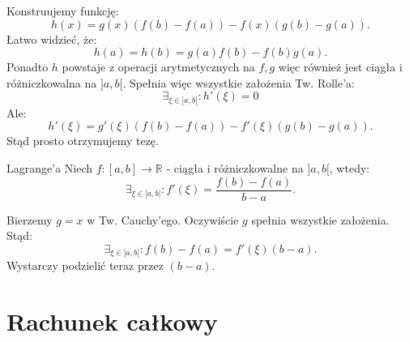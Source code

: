 \documentclass{article}
\numberwithin{defi}{section}
\numberwithin{defi}{section}
\newcommand{\R}{\mathbb{R}}
\begin{document}
    \begin{dow}
        Konstruujemy funkcję: \begin{equation*}
            h(x) = g(x) (f(b) - f(a)) - f(x) (g(b) - g(a)).
        \end{equation*} Łatwo widzieć, że: \begin{equation*}
            h(a) = h(b) = g(a)f(b) - f(b) g(a).
        \end{equation*} Ponadto $h$ powstaje z operacji arytmetycznych na $f, g$ więc również jest ciągła i różniczkowalna na $]a, b[$. Spełnia więc wszystkie założenia Tw. Rolle'a: \begin{equation*}
            \exists_{\xi \in ]a, b[ }: h'(\xi) = 0
        \end{equation*} Ale: \begin{equation*}
            h'(\xi) = g'(\xi) (f(b) - f(a)) - f'(\xi) (g(b) - g(a)).
        \end{equation*} Stąd prosto otrzymujemy tezę.
    \end{dow}

    \begin{twier}{Lagrange'a}
        Niech $f: [a, b] \to \R$ - ciągła i różniczkowalne na $]a, b[$, wtedy:\begin{equation}
            \exists_{\xi \in ]a, b[ }:f'(\xi)  =  \frac{f(b) - f(a)}{b - a}.
        \end{equation} 
    \end{twier}

    \begin{dow}
        Bierzemy $g = x$ w Tw. Cauchy'ego. Oczywiście $g$ spełnia wszystkie założenia. Stąd: \begin{equation}
            \exists_{\xi \in ]a, b[ }:  f(b) - f(a) = f'(\xi) (b - a).
        \end{equation} Wystarczy podzielić teraz przez $(b - a)$.
    \end{dow}



\newpage
\section{Rachunek całkowy}
\end{document}
